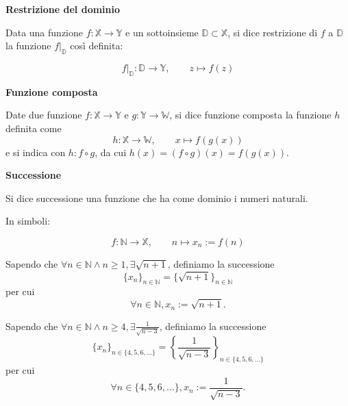 \begin{definition}
    \textbf{Restrizione del dominio}

    Data una funzione $f:\mathbb{X}\rightarrow\mathbb{Y}$ e un sottoinsieme $\mathbb{D}
    \subset\mathbb{X}$,
    si dice restrizione di $f$ a $\mathbb{D}$ la funzione $f\big|_{\mathbb{D}}$ così definita:

    \[
        f\big|_{\mathbb{D}}:
            \mathbb{D}\rightarrow\mathbb{Y}, \qquad
            z\mapsto f\left(z\right)
    \]
\end{definition}

\begin{definition}
    \textbf{Funzione composta}

    Date due funzione $f:\mathbb{X}\rightarrow\mathbb{Y}$ e $g:\mathbb{Y}\rightarrow\mathbb{W}$,
    si dice funzione composta la funzione $h$ definita come
    \[ h: \mathbb{X} \rightarrow \mathbb{W}, \qquad x\mapsto f\left(g\left(x\right)\right)\]
    e si indica con $h: f\circ g$, da cui
    $h\left(x\right)=\left(f\circ g\right)\left(x\right)=f\left(g\left(x\right)\right)$.
\end{definition}

\begin{definition}\label{def:successione}
    \textbf{Successione}

    Si dice successione una funzione che ha come dominio i numeri naturali.
    
    In simboli:

    \[ f: \mathbb{N} \rightarrow \mathbb{X}, \qquad n \mapsto x_n := f\left(n\right) \]
\end{definition}

\begin{example}
    Sapendo che $\forall n \in\mathbb{N} \land n \geq 1, \exists \sqrt{n+1}$, definiamo la successione
    \[
        \{x_n\}_{n\in\mathbb{N}}
        = \{\sqrt{n+1}\}_{n\in\mathbb{N}}
    \]
    per cui
    \[
        \forall n\in\mathbb{N}, x_n := \sqrt{n+1}.
    \]
\end{example}

\begin{example}
    Sapendo che $\forall n \in\mathbb{N} \land n \geq 4, \exists \frac{1}{\sqrt{n-3}}$, definiamo la successione
    \[
        \{x_n\}_{n\in\{4, 5, 6, \ldots\}}
        = \left\{\frac{1}{\sqrt{n-3}}\right\}_{n\in\{4, 5, 6, \ldots\}}
    \]
    per cui
    \[
        \forall n\in\{4, 5, 6, \ldots\}, x_n := \frac{1}{\sqrt{n-3}}.
    \]
\end{example}